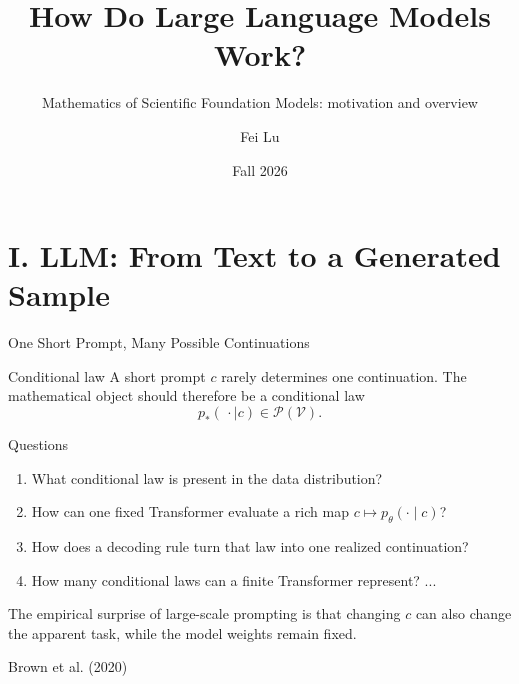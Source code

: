\documentclass[aspectratio=169,11pt]{beamer}
\title{How Do Large Language Models Work?}
\subtitle{Mathematics of Scientific Foundation Models: motivation and overview}
\author{Fei Lu}
\date{Fall 2026 }
\newcommand{\cP}{\mathcal{P}}
\newcommand{\onslidecite}[1]{\par\vspace{0.4ex}\hfill{\scriptsize\color{black!60}#1}}
\begin{document}
\begin{frame}
  \titlepage
\end{frame}

\section{I. LLM: From Text to a Generated Sample}


\begin{frame}{One Short Prompt, Many Possible Continuations}
\begin{block}{Conditional law}
A short prompt $c$ rarely determines one continuation.  The mathematical
object should therefore be a conditional law
\[
  p_*(\,\cdot\mid c)\in\cP(\mathcal V).
\]
\end{block}

\begin{exampleblock}{Questions}
\begin{enumerate}
\item What conditional law is present in the data distribution?
\item How can one fixed Transformer evaluate a rich map $c\mapsto p_\theta(\cdot\mid c)$?
\item How does a decoding rule turn that law into one realized continuation?
\item How many conditional laws can a finite Transformer represent? ...
\end{enumerate}
\end{exampleblock}

\vspace{-0.5ex}
The empirical surprise of large-scale prompting is that changing $c$ can also
change the apparent task, while the model weights remain fixed.
\onslidecite{Brown et al. (2020)}
\end{frame}
\end{document}
